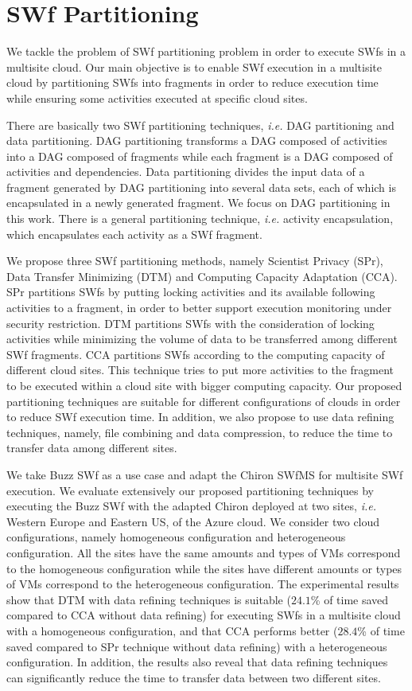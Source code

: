 \section*{SWf Partitioning}
We tackle the problem of SWf partitioning problem in order to execute SWfs in a multisite cloud. Our main objective is to enable SWf execution in a multisite cloud by partitioning SWfs into fragments in order to reduce execution time while ensuring some activities executed at specific cloud sites.

There are basically two SWf partitioning techniques, \textit{i.e.} DAG partitioning and data partitioning. DAG partitioning transforms a DAG composed of activities into a DAG
composed of fragments while each fragment is a DAG composed of activities and dependencies.
Data partitioning divides the input data of a fragment generated by DAG
partitioning into several data sets, each of which is encapsulated in a newly generated
fragment. We focus on DAG partitioning in this work. There is a general partitioning technique, \textit{i.e.} activity encapsulation, which encapsulates each activity as a SWf fragment.

We propose three SWf partitioning methods, namely Scientist Privacy (SPr), Data Transfer Minimizing (DTM) and Computing Capacity Adaptation (CCA). SPr partitions SWfs by putting locking activities and its available following activities to a fragment, in order to better support execution monitoring under security restriction. DTM partitions SWfs with the consideration of locking activities while minimizing the volume of data to be transferred among different SWf fragments. CCA partitions SWfs according to the computing capacity of different cloud sites. This technique tries to put more activities to the fragment to be executed within a cloud site with bigger computing capacity. 
Our proposed partitioning techniques are suitable for different configurations of clouds in order to reduce SWf execution time. In addition, we also propose to use data refining techniques, namely, file combining and data compression, to reduce the time to transfer data among different sites.

We take Buzz SWf as a use case and adapt the Chiron SWfMS for multisite SWf execution. We evaluate extensively our proposed partitioning techniques by executing the Buzz SWf with the adapted Chiron deployed at two sites, \textit{i.e.} Western Europe and Eastern US, of the Azure cloud.
We consider two cloud configurations, namely homogeneous configuration and heterogeneous configuration. All the sites have the same amounts and types of VMs correspond to the homogeneous configuration while the sites have different amounts or types of VMs correspond to the heterogeneous configuration. The experimental results show that DTM with data refining techniques is suitable ($24.1$\% of time saved compared to CCA without data refining) for executing SWfs in a multisite cloud with a homogeneous configuration, and that CCA performs better ($28.4$\% of time saved compared to SPr technique without data refining) with a heterogeneous configuration. In addition, the results also reveal that data refining techniques can significantly reduce the time to transfer data between two different sites. 

